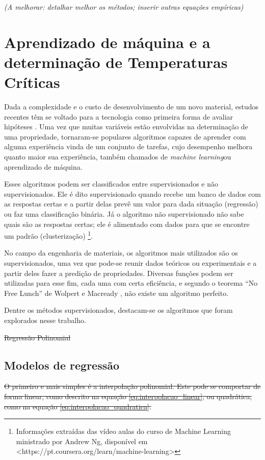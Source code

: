 \documentclass[brazil,tf,epusp]{usp}  %
\providecommand{\DIFadd}[1]{{\protect\color{blue}\uwave{#1}}} %
\providecommand{\DIFdel}[1]{{\protect\color{red}\sout{#1}}}                      %
\providecommand{\DIFaddbegin}{} %
\providecommand{\DIFaddend}{} %
\providecommand{\DIFdelbegin}{} %
\providecommand{\DIFdelend}{} %
\begin{document}
\textit{(A melhorar: detalhar melhor os métodos; inserir outras equações empíricas)}

\section{Aprendizado de m\'aquina e a determinação de Temperaturas Cr\'iticas}

Dada a complexidade e o custo de desenvolvimento de um novo material, estudos recentes têm se voltado para a tecnologia como primeira forma de avaliar hipóteses \cite{Belisle2015}. Uma vez que muitas variáveis estão envolvidas na determinação de uma propriedade, tornaram-se populares algoritmos capazes de aprender com alguma experiência vinda de um conjunto de tarefas, cujo desempenho melhora quanto maior sua experiência, também chamados de \textit{machine learning}\DIFaddbegin \DIFadd{, }\DIFaddend ou aprendizado de máquina.

Esses algoritmos podem ser classificados entre supervisionados e não supervisionados. Ele é dito supervisionado quando recebe um banco de dados com as respostas certas e a partir delas prevê um valor para dada situação (regressão) ou faz uma classificação binária. Já o algoritmo não supervisionado não sabe quais são as respostas certas; ele é alimentado com dados para que se encontre um padrão (clusterização) \footnote{Informações extraídas das vídeo aulas do curso de Machine Learning ministrado por Andrew Ng, disponível em <https://pt.coursera.org/learn/machine-learning>}.

No campo da engenharia de materiais, os algoritmos mais utilizados são os supervisionados, uma vez que pode-se reunir dados teóricos ou experimentais e a partir deles fazer a predição de propriedades. Diversas funções podem ser utilizadas para esse fim, cada uma com certa eficiência, e segundo o teorema ``No Free Lunch'' de Wolpert e Macready  , não existe um algoritmo perfeito.

Dentre os métodos supervisionados, destacam-se os algoritmos que foram explorados nesse trabalho.

\DIFdelbegin \DIFdel{Regressão Polinomial} \DIFdelend
\subsection{Modelos de regress\~ao}

\DIFdelbegin \DIFdel{O primeiro e mais simples é a interpolação polinomial.
Este pode se comportar de forma linear, como descrito na equação \ref{eq:interpolacao_linear}, ou quadrática, como na equação \ref{eq:interpolacao_quadratica}.}
\end{document}
